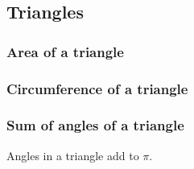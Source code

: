 
\subsection{Triangles}
\subsubsection{Area of a triangle}

\subsubsection{Circumference of a triangle}

\subsubsection{Sum of angles of a triangle}

Angles in a triangle add to \(\pi \).

